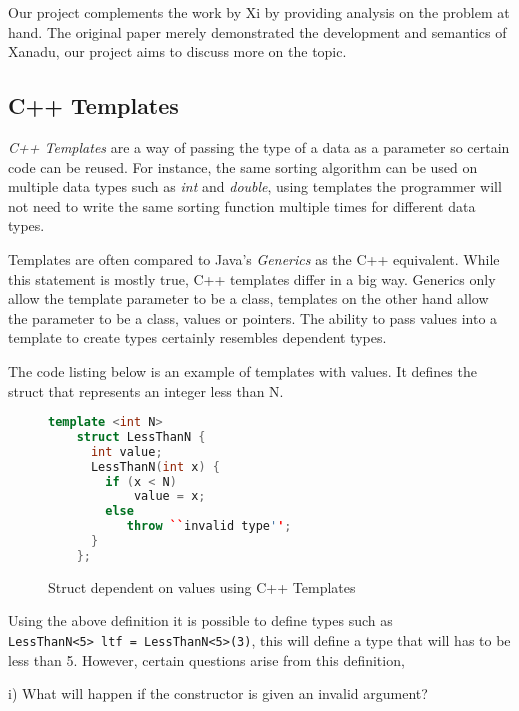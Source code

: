 \documentclass[a4paper,12pt]{report}
\begin{document}
\par
Our project complements the work by Xi by providing analysis on the problem at 
hand. The original paper merely demonstrated the development and semantics of 
Xanadu, our project aims to discuss more on the topic. 

\subsection{C++ Templates}
\textit{C++ Templates} \cite{cppTemplate} are a way of passing the type of a 
data as a parameter so certain code can be reused. For instance, the same 
sorting algorithm can be used on multiple data types such as \textit{int} and 
\textit{double}, using templates the programmer will not need to write the same 
sorting function multiple times for different data types. 

\par
Templates are often compared to Java's \textit{Generics} \cite{javaGenerics} 
as the C++ equivalent. While this statement is mostly true, C++ templates 
differ in a big way. 
Generics only allow the template parameter to be a class, templates on the other 
hand allow the parameter to be a class, values or pointers. The ability to 
pass values into a template to create types certainly resembles dependent types.

\par
The code listing below is an example of templates with values. It defines the 
struct that represents an integer less than N. 

\begin{figure}[H]
  \begin{lstlisting}[language=c++]     
    template <int N>
    struct LessThanN {
      int value;
      LessThanN(int x) {
        if (x < N)
            value = x;
        else
           throw ``invalid type'';
      }
    };
  \end{lstlisting}
  \caption{Struct dependent on values using C++ Templates}
\end{figure}

\par
Using the above definition it is possible to define types such as \\
\verb+LessThanN<5> ltf = LessThanN<5>(3)+, this will define a type that will has 
to be less than 5. However, certain questions arise from this definition, 

i) What will happen if the constructor is given an invalid argument? 
\end{document}
